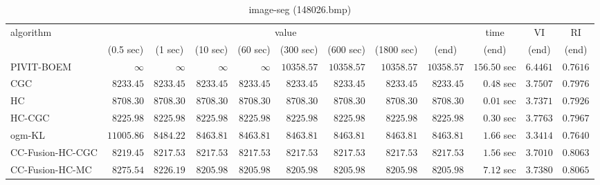 \begin{table}[H]
\scriptsize
\centering
\caption{image-seg (148026.bmp)}
\label{tab:anytimetable-image-seg-148026.bmp}
\begin{tabular}{lrrrrrrrrrrr}
\toprule
           algorithm &                                   \multicolumn{8}{c}{value} & \multicolumn{1}{c}{time}    & \multicolumn{1}{c}{VI}  & \multicolumn{1}{c}{RI} \\  
\cmidrule(lr){2-9}\cmidrule(lr){10-10} \cmidrule(lr){11-11} \cmidrule(lr){12-12}   
                     & \multicolumn{1}{c}{(0.5 sec)} & \multicolumn{1}{c}{(1 sec)} & \multicolumn{1}{c}{(10 sec)} & \multicolumn{1}{c}{(60 sec)} & \multicolumn{1}{c}{(300 sec)} & \multicolumn{1}{c}{(600 sec)} & \multicolumn{1}{c}{(1800 sec)} & \multicolumn{1}{c}{(end)} & \multicolumn{1}{c}{(end)}    & \multicolumn{1}{c}{(end)}   & \multicolumn{1}{c}{(end)}  \\ \midrule 
          PIVIT-BOEM & $\infty$ & $\infty$ & $\infty$ & $\infty$ & $     10358.57$ & $     10358.57$ & $     10358.57$ & $     10358.57$ & $       156.50$ sec    & $       6.4461$  & $       0.7616$ \\ 
                 CGC & $      8233.45$ & $      8233.45$ & $      8233.45$ & $      8233.45$ & $      8233.45$ & $      8233.45$ & $      8233.45$ & $      8233.45$ & $         0.48$ sec    & $       3.7507$  & $       0.7976$ \\ 
                  HC & $      8708.30$ & $      8708.30$ & $      8708.30$ & $      8708.30$ & $      8708.30$ & $      8708.30$ & $      8708.30$ & $      8708.30$ & $         0.01$ sec    & $       3.7371$  & $       0.7926$ \\ 
              HC-CGC & $      8225.98$ & $      8225.98$ & $      8225.98$ & $      8225.98$ & $      8225.98$ & $      8225.98$ & $      8225.98$ & $      8225.98$ & $         0.30$ sec    & $       3.7763$  & $       0.7967$ \\ 
              ogm-KL & $     11005.86$ & $      8484.22$ & $      8463.81$ & $      8463.81$ & $      8463.81$ & $      8463.81$ & $      8463.81$ & $      8463.81$ & $         1.66$ sec    & $       3.3414$  & $       0.7640$ \\ 
    CC-Fusion-HC-CGC & $      8219.45$ & $      8217.53$ & $      8217.53$ & $      8217.53$ & $      8217.53$ & $      8217.53$ & $      8217.53$ & $      8217.53$ & $         1.56$ sec    & $       3.7010$  & $       0.8063$ \\ 
     CC-Fusion-HC-MC & $      8275.54$ & $      8226.19$ & $      8205.98$ & $      8205.98$ & $      8205.98$ & $      8205.98$ & $      8205.98$ & $      8205.98$ & $         7.12$ sec    & $       3.7380$  & $       0.8065$ \\ 

\end{tabular}
\end{table}
